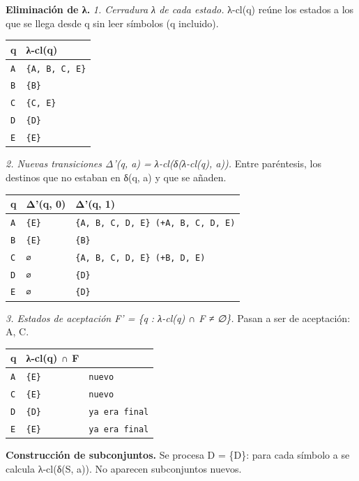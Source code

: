 \documentclass[11pt]{article}
\begin{document}
\textbf{Eliminación de λ.} \textit{1. Cerradura λ de cada estado.} λ-cl(q) reúne los estados a los que se llega desde q sin leer símbolos (q incluido).
\begin{center}\footnotesize\begin{tabular}{ll}\toprule
q & λ-cl(q) \\\midrule
\texttt{A} & \texttt{\{A, B, C, E\}} \\
\texttt{B} & \texttt{\{B\}} \\
\texttt{C} & \texttt{\{C, E\}} \\
\texttt{D} & \texttt{\{D\}} \\
\texttt{E} & \texttt{\{E\}} \\
\bottomrule\end{tabular}\end{center}
\textit{2. Nuevas transiciones Δ'(q, a) = λ-cl(δ(λ-cl(q), a)).} Entre paréntesis, los destinos que no estaban en δ(q, a) y que se añaden.
\begin{center}\footnotesize\begin{tabular}{lll}\toprule
q & Δ'(q, 0) & Δ'(q, 1) \\\midrule
\texttt{A} & \texttt{\{E\}} & \texttt{\{A, B, C, D, E\}  (+A, B, C, D, E)} \\
\texttt{B} & \texttt{\{E\}} & \texttt{\{B\}} \\
\texttt{C} & \texttt{∅} & \texttt{\{A, B, C, D, E\}  (+B, D, E)} \\
\texttt{D} & \texttt{∅} & \texttt{\{D\}} \\
\texttt{E} & \texttt{∅} & \texttt{\{D\}} \\
\bottomrule\end{tabular}\end{center}
\textit{3. Estados de aceptación F' = \{q : λ-cl(q) ∩ F ≠ ∅\}.} Pasan a ser de aceptación: A, C.
\begin{center}\footnotesize\begin{tabular}{lll}\toprule
q & λ-cl(q) ∩ F &  \\\midrule
\texttt{A} & \texttt{\{E\}} & \texttt{nuevo} \\
\texttt{C} & \texttt{\{E\}} & \texttt{nuevo} \\
\texttt{D} & \texttt{\{D\}} & \texttt{ya era final} \\
\texttt{E} & \texttt{\{E\}} & \texttt{ya era final} \\
\bottomrule\end{tabular}\end{center}
\textbf{Construcción de subconjuntos.} Se procesa D = \{D\}: para cada símbolo a se calcula λ-cl(δ(S, a)). No aparecen subconjuntos nuevos.
\end{document}
